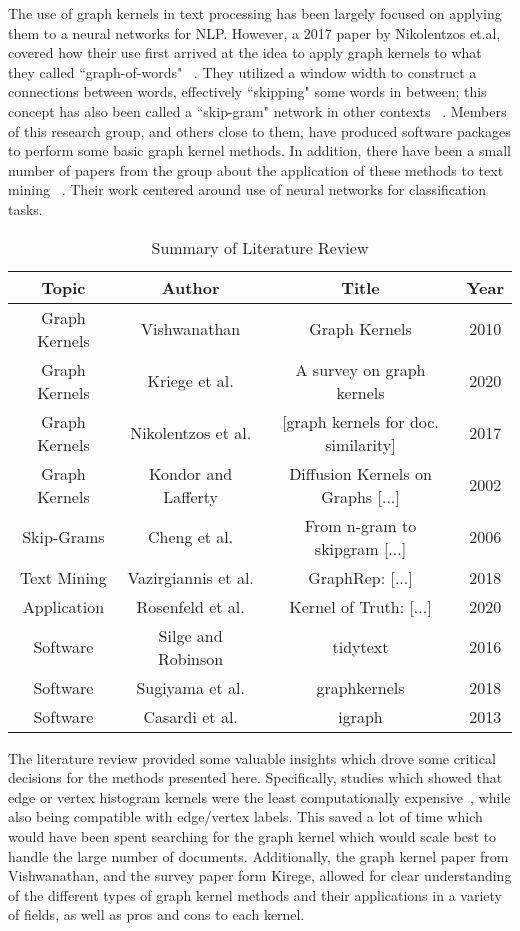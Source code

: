 The use of graph kernels in text processing has been largely focused on applying them to a neural networks for NLP. However, a 2017 paper by Nikolentzos et.al, covered how their use first arrived at the idea to apply graph kernels to what they called ``graph-of-words" ~\cite{nikolentzos2017shortest}. They utilized a window width to construct a connections between words, effectively ``skipping" some words in between; this concept has also been called a ``skip-gram" network in other contexts ~\cite{cheng2006n}. Members of this research group, and others close to them, have produced software packages to perform some basic graph kernel methods. In addition, there have been a small number of papers from the group about the application of these methods to text mining ~\cite{sugiyama2018graphkernels}. Their work centered around use of neural networks for classification tasks. 
\begin{table}[H]
\caption{Summary of Literature Review}
\centering
\begin{tabular}{ c c c c}
\hline
\hline
Topic & Author & Title & Year \\ [0.5ex]
\hline
Graph Kernels & Vishwanathan & Graph Kernels & 2010\\
Graph Kernels & Kriege et al. & A survey on graph kernels & 2020\\
Graph Kernels & Nikolentzos et al. & [graph kernels for doc. similarity] & 2017\\
Graph Kernels & Kondor and Lafferty &  Diffusion Kernels on Graphs [...] & 2002\\
Skip-Grams & Cheng et al. & From n-gram to skipgram [...] & 2006\\
Text Mining & Vazirgiannis et al. & GraphRep: [...] & 2018 \\
Application & Rosenfeld et al. & Kernel of Truth: [...] & 2020\\
Software & Silge and Robinson& tidytext &  2016\\
Software & Sugiyama et al. & graphkernels & 2018 \\
Software & Casardi et al. & igraph & 2013\\
\hline
\end{tabular}
\end{table}

The literature review provided some valuable insights which drove some critical decisions for the methods presented here. Specifically, studies which showed that edge or vertex histogram kernels were the least computationally expensive~\cite{sugiyama2018graphkernels}, while also being compatible with edge/vertex labels. This saved a lot of time which would have been spent searching for the graph kernel which would scale best to handle the large number of documents. Additionally, the graph kernel paper from Vishwanathan, and the survey paper form Kirege, allowed for clear understanding of the different types of graph kernel methods and their applications in a variety of fields, as well as pros and cons to each kernel.\\

